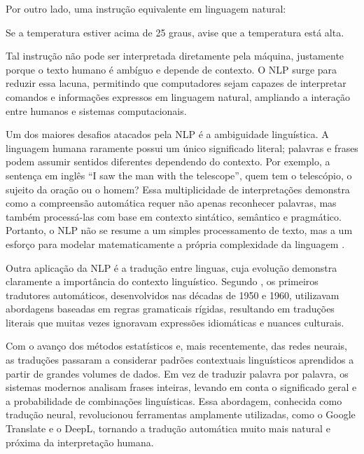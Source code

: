 \noindent Por outro lado, uma instrução equivalente em linguagem natural:
\begin{tcolorbox}[
  colback=yellow!20, 
  colframe=black,
  width=0.8\linewidth,   %
  left=0pt,               %
  boxsep=2mm,
  enlarge left by=0.1\linewidth  %
]
Se a temperatura estiver acima de 25 graus, avise que a temperatura está alta.
\end{tcolorbox}
Tal instrução não pode ser interpretada diretamente pela máquina, justamente porque o texto humano é ambíguo e depende de contexto. 
O NLP surge para reduzir essa lacuna, permitindo que computadores sejam capazes de interpretar comandos e informações expressos em linguagem natural, ampliando a interação entre humanos e sistemas computacionais.


Um dos maiores desafios atacados pela NLP é a ambiguidade linguística. A linguagem humana raramente possui um único significado literal; palavras e frases podem assumir sentidos diferentes dependendo do contexto. Por exemplo, a sentença em inglês “I saw the man with the telescope”, quem tem o telescópio, o sujeito da oração ou o homem? Essa multiplicidade de interpretações demonstra como a compreensão automática requer não apenas reconhecer palavras, mas também processá-las com base em contexto sintático, semântico e pragmático. Portanto, o NLP não se resume a um simples processamento de texto, mas a um esforço para modelar matematicamente a própria complexidade da linguagem \cite{jurafsky2023speech}.


Outra aplicação da NLP é a tradução entre linguas, cuja evolução demonstra claramente a importância do contexto linguístico. Segundo \textcite{hutchins2005history}, os primeiros tradutores automáticos, desenvolvidos nas décadas de 1950 e 1960, utilizavam abordagens baseadas em regras gramaticais rígidas, resultando em traduções literais que muitas vezes ignoravam expressões idiomáticas e nuances culturais.

Com o avanço dos métodos estatísticos e, mais recentemente, das redes neurais, as traduções passaram a considerar padrões contextuais linguísticos aprendidos a partir de grandes volumes de dados. Em vez de traduzir palavra por palavra, os sistemas modernos analisam frases inteiras, levando em conta o significado geral e a probabilidade de combinações linguísticas. Essa abordagem, conhecida como tradução neural, revolucionou ferramentas amplamente utilizadas, como o Google Translate e o DeepL, tornando a tradução automática muito mais natural e próxima da interpretação humana.

